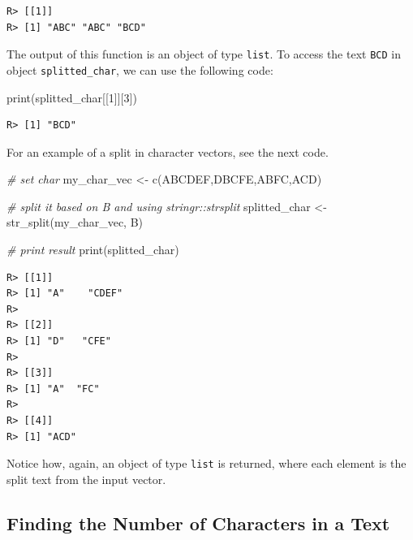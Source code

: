 \documentclass[
  12pt,
]{book}
\newenvironment{Shaded}{\begin{snugshade}}{\end{snugshade}}
\newcommand{\CommentTok}[1]{\textcolor[rgb]{0.37,0.37,0.37}{\textit{#1}}}
\newcommand{\DecValTok}[1]{\textcolor[rgb]{0.06,0.06,0.06}{#1}}
\newcommand{\FunctionTok}[1]{\textcolor[rgb]{0,0,0}{#1}}
\newcommand{\NormalTok}[1]{#1}
\newcommand{\OtherTok}[1]{\textcolor[rgb]{0.37,0.37,0.37}{#1}}
\newcommand{\StringTok}[1]{\textcolor[rgb]{0.5,0.5,0.5}{#1}}
\begin{document}
\begin{verbatim}
R> [[1]]
R> [1] "ABC" "ABC" "BCD"
\end{verbatim}

The output of this function is an object of type \texttt{list}. To access the text \texttt{BCD} in object \texttt{splitted\_char}, we can use the following code:

\begin{Shaded}
\begin{Highlighting}[]
\FunctionTok{print}\NormalTok{(splitted\_char[[}\DecValTok{1}\NormalTok{]][}\DecValTok{3}\NormalTok{])}
\end{Highlighting}
\end{Shaded}

\begin{verbatim}
R> [1] "BCD"
\end{verbatim}

For an example of a split in character vectors, see the next code.

\begin{Shaded}
\begin{Highlighting}[]
\CommentTok{\# set char}
\NormalTok{my\_char\_vec }\OtherTok{\textless{}{-}} \FunctionTok{c}\NormalTok{(}\StringTok{\textquotesingle{}ABCDEF\textquotesingle{}}\NormalTok{,}\StringTok{\textquotesingle{}DBCFE\textquotesingle{}}\NormalTok{,}\StringTok{\textquotesingle{}ABFC\textquotesingle{}}\NormalTok{,}\StringTok{\textquotesingle{}ACD\textquotesingle{}}\NormalTok{)}

\CommentTok{\# split it based on \textquotesingle{}B\textquotesingle{} and using stringr::strsplit}
\NormalTok{splitted\_char }\OtherTok{\textless{}{-}} \FunctionTok{str\_split}\NormalTok{(my\_char\_vec, }\StringTok{\textquotesingle{}B\textquotesingle{}}\NormalTok{)}

\CommentTok{\# print result}
\FunctionTok{print}\NormalTok{(splitted\_char)}
\end{Highlighting}
\end{Shaded}

\begin{verbatim}
R> [[1]]
R> [1] "A"    "CDEF"
R> 
R> [[2]]
R> [1] "D"   "CFE"
R> 
R> [[3]]
R> [1] "A"  "FC"
R> 
R> [[4]]
R> [1] "ACD"
\end{verbatim}

Notice how, again, an object of type \texttt{list} is returned, where each element is the split text from the input vector.

\hypertarget{finding-the-number-of-characters-in-a-text}{%
\subsection{Finding the Number of Characters in a Text}\label{finding-the-number-of-characters-in-a-text}}
\end{document}
